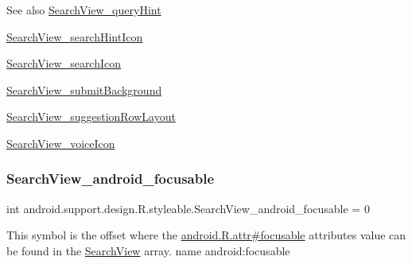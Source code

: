 \begin{DoxySeeAlso}{See also}
\hyperlink{classandroid_1_1support_1_1design_1_1R_1_1styleable_a879468cbbd5600253d62fe8000d05975}{Search\+View\+\_\+query\+Hint} 

\hyperlink{classandroid_1_1support_1_1design_1_1R_1_1styleable_a9c896f5dd793d57c75958116ba69b26c}{Search\+View\+\_\+search\+Hint\+Icon} 

\hyperlink{classandroid_1_1support_1_1design_1_1R_1_1styleable_a4261289fdaf3e932d53a3c70b119b5bf}{Search\+View\+\_\+search\+Icon} 

\hyperlink{classandroid_1_1support_1_1design_1_1R_1_1styleable_accdf4bff313010f9ca3ee8384626b8cb}{Search\+View\+\_\+submit\+Background} 

\hyperlink{classandroid_1_1support_1_1design_1_1R_1_1styleable_aa9bcaf27bf978930d50357c99f8abada}{Search\+View\+\_\+suggestion\+Row\+Layout} 

\hyperlink{classandroid_1_1support_1_1design_1_1R_1_1styleable_ab8427471179b0f69c665ef59d850bd39}{Search\+View\+\_\+voice\+Icon} 
\end{DoxySeeAlso}
\mbox{\label{classandroid_1_1support_1_1design_1_1R_1_1styleable_a7ac28ac6ee547e469ab02402f744e213}} 
\subsubsection{\texorpdfstring{Search\+View\+\_\+android\+\_\+focusable}{SearchView\_android\_focusable}}
{\footnotesize\ttfamily int android.\+support.\+design.\+R.\+styleable.\+Search\+View\+\_\+android\+\_\+focusable = 0\hspace{0.3cm}{\ttfamily [static]}}

This symbol is the offset where the \hyperlink{}{android.\+R.\+attr\#focusable} attribute\textquotesingle{}s value can be found in the \hyperlink{classandroid_1_1support_1_1design_1_1R_1_1styleable_a8f7e72dc1bf854e14c1be7dbc1cb7392}{Search\+View} array.  name android\+:focusable \mbox{\label{classandroid_1_1support_1_1design_1_1R_1_1styleable_af9de3573ac6e0e2c6743858a629db9e5}} 
